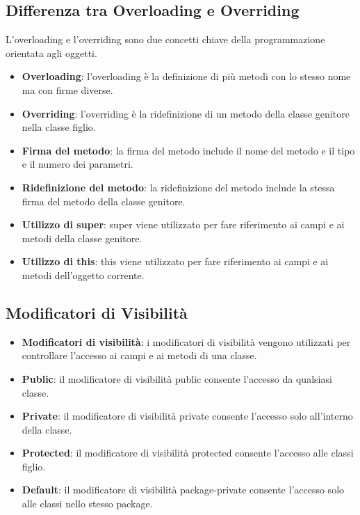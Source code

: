\documentclass[11pt]{article}
\begin{document}
\subsection{Differenza tra Overloading e Overriding}
L'overloading e l'overriding sono due concetti chiave della programmazione orientata agli oggetti.
\begin{itemize}
    \item \textbf{Overloading}: l'overloading è la definizione di più metodi con lo stesso nome ma con firme diverse.
    \item \textbf{Overriding}: l'overriding è la ridefinizione di un metodo della classe genitore nella classe figlio.
    \item \textbf{Firma del metodo}: la firma del metodo include il nome del metodo e il tipo e il numero dei parametri.
    \item \textbf{Ridefinizione del metodo}: la ridefinizione del metodo include la stessa firma del metodo della classe genitore.
    \item \textbf{Utilizzo di super}: super viene utilizzato per fare riferimento ai campi e ai metodi della classe genitore.
    \item \textbf{Utilizzo di this}: this viene utilizzato per fare riferimento ai campi e ai metodi dell'oggetto corrente.
\end{itemize}
\subsection{Modificatori di Visibilità}
\begin{itemize}
    \item \textbf{Modificatori di visibilità}: i modificatori di visibilità vengono utilizzati per controllare l'accesso ai campi e ai metodi di una classe.
    \item \textbf{Public}: il modificatore di visibilità public consente l'accesso da qualsiasi classe.
    \item \textbf{Private}: il modificatore di visibilità private consente l'accesso solo all'interno della classe.
    \item \textbf{Protected}: il modificatore di visibilità protected consente l'accesso alle classi figlio.
    \item \textbf{Default}: il modificatore di visibilità package-private consente l'accesso solo alle classi nello stesso package.
\end{itemize}
\end{document}
